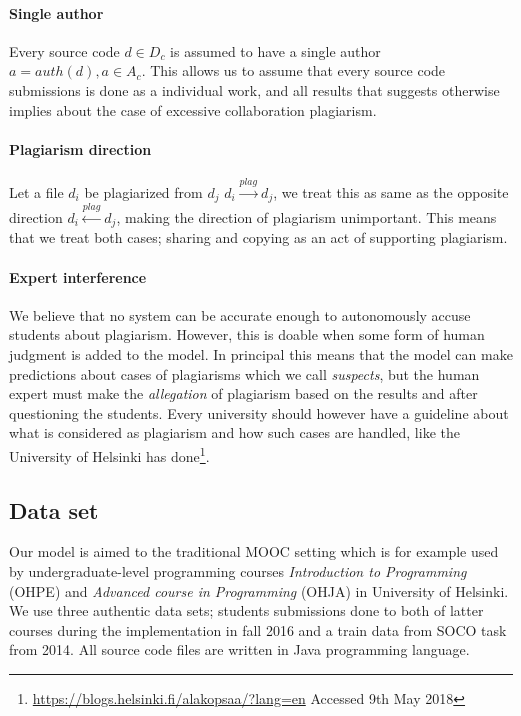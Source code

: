 \paragraph{Single author} 
Every source code $d \in D_c$ is assumed to have a single author $a = auth(d), a \in A_c$. This allows us to assume that every source code submissions is done as a individual work, and all results that suggests otherwise implies about the case of excessive collaboration \ie plagiarism. 

\paragraph{Plagiarism direction} 
Let a file $d_i$ be plagiarized from $d_j$ \ie $d_i \xrightarrow{plag} d_j$, we treat this as same as the opposite direction $d_i \xleftarrow{plag} d_j$, making the direction of plagiarism unimportant. This means that we treat both cases; sharing and copying as an act of supporting plagiarism. 

\paragraph{Expert interference}
We believe that no system can be accurate enough to autonomously accuse students about plagiarism. However, this is doable when some form of human judgment is added to the model. In principal this means that the model can make predictions about cases of plagiarisms which we call \emph{suspects}, but the human expert must make the \emph{allegation} of plagiarism based on the results and after questioning the students. Every university should however have a guideline about what is considered as plagiarism and how such cases are handled, like the University of Helsinki has done\footnote{\url{https://blogs.helsinki.fi/alakopsaa/?lang=en} Accessed 9th May 2018}.

\subsection{Data set}

Our model is aimed to the traditional MOOC setting which is for example used by  undergraduate-level programming courses \emph{Introduction to Programming} (OHPE) and \emph{Advanced course in Programming} (OHJA) in University of Helsinki. We use three authentic data sets; students submissions done to both of latter courses during the implementation in fall 2016 and a train data from SOCO task from 2014. All source code files are written in Java programming language. 

